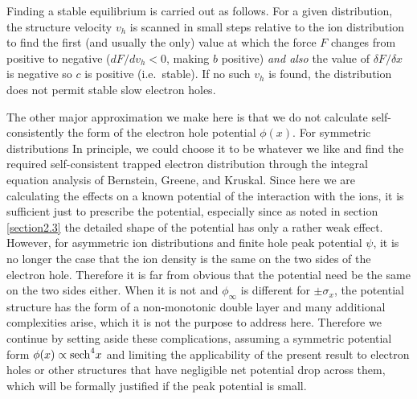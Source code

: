 \documentclass[12pt]{article}
\begin{document}
Finding a stable equilibrium is carried out as follows.  For a given
distribution, the structure velocity $v_h$ is scanned in small steps
relative to the ion distribution to find the first (and usually the
only) value at which the force $F$ changes from positive to negative
($dF/dv_h<0$, making $b$ positive) \emph{and also} the value of
$\delta F/\delta x$ is negative so $c$ is positive (i.e.\ stable). If
no such $v_h$ is found, the distribution does not permit stable slow
electron holes. 

The other major approximation we make here is that we do not calculate
self-consistently the form of the electron hole potential
$\phi(x)$. For symmetric distributions In principle, we could choose
it to be whatever we like and find the required self-consistent
trapped electron distribution through the integral equation analysis
of Bernstein, Greene, and Kruskal\cite{Bernstein1957,Hutchinson2017}. Since here we
are calculating the effects on a known potential of the interaction
with the ions, it is sufficient just to prescribe the potential,
especially since as noted in section \ref{section2.3} the detailed
shape of the potential has only a rather weak effect. However, for
asymmetric ion distributions and finite hole peak potential $\psi$, it
is no longer the case that the ion density is the same on the two
sides of the electron hole. Therefore it is far from obvious that the
potential need be the same on the two sides either. When it is not and
$\phi_\infty$ is different for $\pm\sigma_x$, the potential structure
has the form of a non-monotonic double layer\cite{Raadu1989} and many
additional complexities arise, which it is not the purpose to address
here. Therefore we continue by setting aside these complications,
assuming a symmetric potential form $\phi(x)\propto{\rm sech}^4x$ and
limiting the applicability of the present result to electron holes or
other structures that have negligible net potential drop across them,
which will be formally justified if the peak potential is small.
\end{document}
